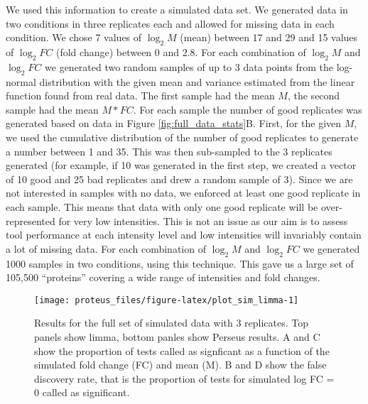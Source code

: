 \documentclass[]{article}
\begin{document}
We used this information to create a simulated data set. We generated
data in two conditions in three replicates each and allowed for missing
data in each condition. We chose 7 values of \(\log_2 M\) (mean) between
17 and 29 and 15 values of \(\log_2 FC\) (fold change) between 0 and
2.8. For each combination of \(\log_2 M\) and \(\log_2 FC\) we generated
two random samples of up to 3 data points from the log-normal
distribution with the given mean and variance estimated from the linear
function found from real data. The first sample had the mean \(M\), the
second sample had the mean \(M * FC\). For each sample the number of
good replicates was generated based on data in Figure
\ref{fig:full_data_stats}B. First, for the given \(M\), we used the
cumulative distribution of the number of good replicates to generate a
number between 1 and 35. This was then sub-sampled to the 3 replicates
generated (for example, if 10 was generated in the first step, we
created a vector of 10 good and 25 bad replicates and drew a random
sample of 3). Since we are not interested in samples with no data, we
enforced at least one good replicate in each sample. This means that
data with only one good replicate will be over-represented for very low
intensities. This is not an issue as our aim is to assess tool
performance at each intensity level and low intensities will invariably
contain a lot of missing data. For each combination of \(\log_2 M\) and
\(\log_2 FC\) we generated 1000 samples in two conditions, using this
technique. This gave us a large set of 105,500 ``proteins'' covering a
wide range of intensities and fold changes.

\begin{figure}[H]

{\centering \texttt{[image: proteus\_files/figure-latex/plot\_sim\_limma-1]} 

}

\caption{\label{fig:simulation_rates}Results for the full set of simulated data with 3 replicates. Top panels show limma, bottom panles show Perseus results. A and C show the proportion of tests called as signficant as a function of the simulated fold change (FC) and mean (M). B and D show the false discovery rate, that is the proportion of tests for simulated log FC = 0 called as significant.}\label{fig:plot_sim_limma}
\end{figure}
\end{document}
